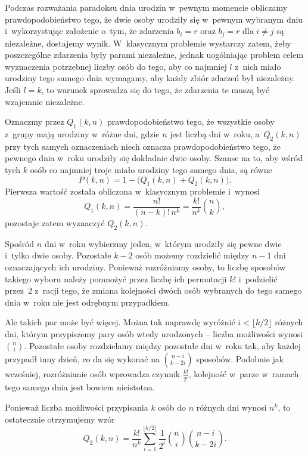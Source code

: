 \exercise %
Podczas rozważania paradoksu dnia urodzin w~pewnym momencie obliczamy prawdopodobieństwo tego, że dwie osoby urodziły się w~pewnym wybranym dniu i~wykorzystując założenie o~tym, że zdarzenia $b_i=r$ oraz $b_j=r$ dla $i\ne j$ są niezależne, dostajemy wynik. W~klasycznym problemie wystarczy zatem, żeby poszczególne zdarzenia były parami niezależne, jednak uogólniając problem celem wyznaczenia potrzebnej liczby osób do tego, aby co najmniej $l$ z~nich miało urodziny tego samego dnia wymagamy, aby każdy  zbiór zdarzeń był niezależny. Jeśli $l=k$, to warunek sprowadza się do tego, że zdarzenia te muszą być wzajemnie niezależne.

\exercise %
Oznaczmy przez $Q_1(k,n)$ prawdopodobieństwo tego, że wszystkie osoby z~grupy  mają urodziny w~różne dni, gdzie $n$ jest liczbą dni w~roku, a~$Q_2(k,n)$ przy tych samych oznaczeniach niech oznacza prawdopodobieństwo tego, że pewnego dnia w~roku urodziły się dokładnie dwie osoby. Szanse na to, aby wśród tych $k$ osób co najmniej troje miało urodziny tego samego dnia, są równe
\[
    P(k,n) = 1-\bigl(Q_1(k,n)+Q_2(k,n)\bigr).
\]
Pierwsza wartość została obliczona w~klasycznym problemie i~wynosi
\[
    Q_1(k,n) = \frac{n!}{(n-k)!\,n^k} = \frac{k!}{n^k}\binom{n}{k},
\]
pozostaje zatem wyznaczyć $Q_2(k,n)$.

Spośród $n$ dni w~roku wybierzmy jeden, w~którym urodziły się pewne dwie i~tylko dwie osoby. Pozostałe $k-2$ osób możemy rozdzielić między $n-1$ dni oznaczających ich urodziny. Ponieważ rozróżniamy osoby, to liczbę sposobów takiego wyboru należy pomnożyć przez liczbę ich permutacji $k!$ i~podzielić przez~2 z~racji tego, że zmiana kolejności dwóch osób wybranych do tego samego dnia w~roku nie jest odrębnym przypadkiem.

Ale takich par może być więcej. Można tak naprawdę wyróżnić $i<\lfloor k/2\rfloor$ różnych dni, którym przypiszemy pary osób wtedy urodzonych -- liczba możliwości wynosi $\binom{n}{i}$. Pozostałe osoby rozdzielamy między pozostałe dni w~roku tak, aby każdej przypadł inny dzień, co da się wykonać na $\binom{n-i}{k-2i}$ sposobów. Podobnie jak wcześniej, rozróżnianie osób wprowadza czynnik $\frac{k!}{2^i}$, kolejność w~parze w~ramach tego samego dnia jest bowiem nieistotna.

Ponieważ liczba możliwości przypisania $k$ osób do $n$ różnych dni wynosi $n^k$, to ostatecznie otrzymujemy wzór
\[
    Q_2(k,n) = \frac{k!}{n^k}\sum_{i=1}^{\lfloor k/2\rfloor}\frac{1}{2^i}\binom{n}{i}\binom{n-i}{k-2i}.
\]

